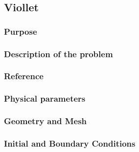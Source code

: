 \subsection{Viollet}
%

%    
\subsubsection{Purpose}
%

%
\subsubsection{Description of the problem}
%

%    
%
\subsubsection{Reference}
%

%
%
\subsubsection{Physical parameters}
%

%
%
\subsubsection{Geometry and Mesh}
%

%
%
\subsubsection{Initial and Boundary Conditions}
%

%
%
